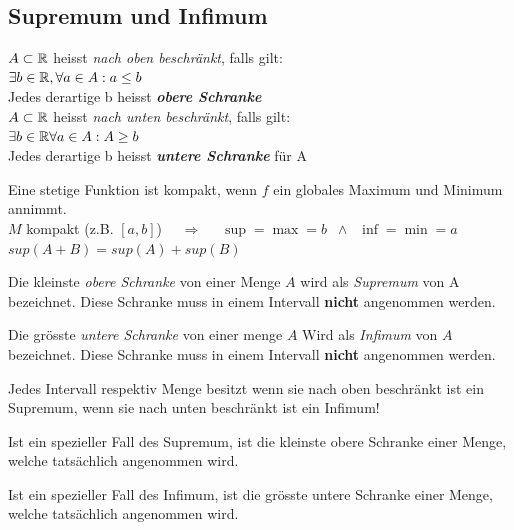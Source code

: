 \documentclass[a4paper]{article}
\begin{document}
\subsection{Supremum und Infimum}
	\begin{fsatz}
	\vspace{-5mm}
	\begin{multicols}{2}
		$A \subset \mathbb{R}$ heisst \textit{nach oben beschränkt},
		falls gilt:\\
		\quad $\exists b \in \mathbb{R}, \forall a \in A: a\leq b$\\
		Jedes derartige b heisst \textit{\textbf{obere Schranke}}\\
		$A \subset \mathbb{R}$ heisst \textit{nach unten beschränkt},
		falls gilt:\\
		\quad $\exists b \in \mathbb{R} \forall a \in A: A \geq b$\\
		Jedes derartige b heisst \textit{\textbf{untere Schranke}}
		für A
	\end{multicols}
	\vspace{-3mm}
	\end{fsatz}
	Eine stetige Funktion ist kompakt, wenn $f$ ein globales Maximum
	und Minimum annimmt.\\
	$M$ kompakt (z.B. $[a,b]$) $\quad \Rightarrow \quad$  $\sup = \max = b \;\; \wedge \;\; \inf = \min =
	a$ \quad $sup(A + B)= sup(A)+sup(B)$

	\begin{multicols}{2}
	\begin{fdef}[Supremum]
		Die kleinste \textit{obere Schranke} von einer Menge $A$ wird als
		\textit{Supremum} von A bezeichnet. Diese Schranke muss in
		einem Intervall \textbf{nicht} angenommen werden.
	\end{fdef}

	\begin{fdef}[Infimum]
		Die grösste \textit{untere Schranke} von einer menge $A$
		Wird als \textit{Infimum} von $A$ bezeichnet. Diese Schranke
		muss in einem Intervall \textbf{nicht} angenommen werden.
	\end{fdef}
	\end{multicols}
	\vspace{-5mm}
	Jedes Intervall respektiv Menge besitzt wenn sie nach oben beschränkt ist ein
	Supremum, wenn sie nach unten beschränkt ist ein Infimum!

	\vspace{-3mm}
\begin{multicols}{2}
	\begin{fdef}[Maximum]
		Ist ein spezieller Fall des Supremum, ist die kleinste
		obere Schranke einer Menge, welche tatsächlich
		angenommen wird.
	\end{fdef}

	\begin{fdef}[Minimum]
		Ist ein spezieller Fall des Infimum, ist die grösste untere
		Schranke einer Menge, welche tatsächlich angenommen wird.
	\end{fdef}
	\end{multicols}
\end{document}
